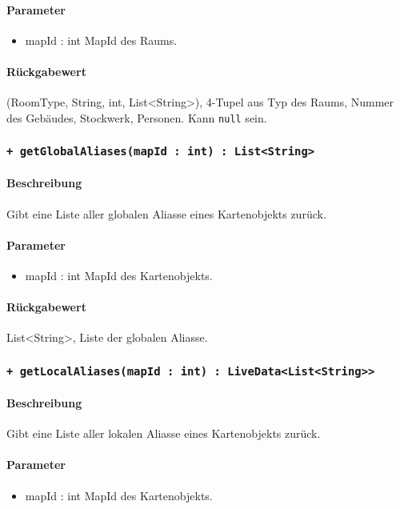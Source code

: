 \paragraph*{Parameter}
\begin{itemize}
    \item mapId : int MapId des Raums.
\end{itemize}
\paragraph*{Rückgabewert}
(RoomType, String, int, List<String>), 4-Tupel aus Typ des Raums, Nummer des Gebäudes, Stockwerk, Personen. Kann \texttt{null} sein.

\subsubsection*{\texttt{+ getGlobalAliases(mapId : int) : List<String>}}%
\paragraph*{Beschreibung}
Gibt eine Liste aller globalen Aliasse eines Kartenobjekts zurück.
\paragraph*{Parameter}
\begin{itemize}
    \item mapId : int MapId des Kartenobjekts.
\end{itemize}
\paragraph*{Rückgabewert}
List<String>, Liste der globalen Aliasse.

\subsubsection*{\texttt{+ getLocalAliases(mapId : int) : LiveData<List<String>>}}%
\paragraph*{Beschreibung}
Gibt eine Liste aller lokalen Aliasse eines Kartenobjekts zurück.
\paragraph*{Parameter}
\begin{itemize}
    \item mapId : int MapId des Kartenobjekts.
\end{itemize}
